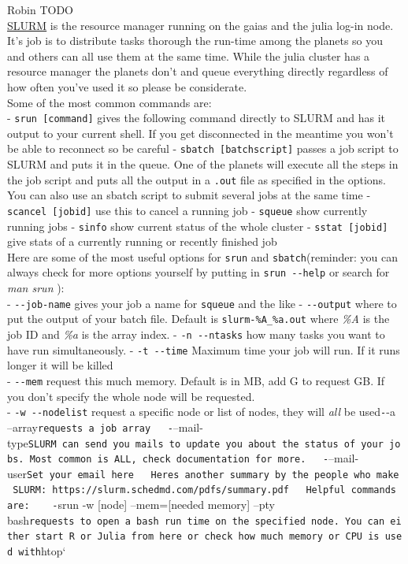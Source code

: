 \documentclass[
]{book}
\begin{document}
Robin TODO\\
\href{https://slurm.schedmd.com/overview.html}{SLURM} is the resource manager
running on the gaias and the julia log-in node. It's job is to
distribute tasks thorough the run-time among the planets so you and
others can all use them at the same time. While the julia cluster has a
resource manager the planets don't and queue everything directly
regardless of how often you've used it so please be considerate.\\
Some of the most common commands are:\\
- \texttt{srun\ {[}command{]}} gives the following command directly to SLURM and has
it output to your current shell. If you get disconnected in the meantime
you won't be able to reconnect so be careful - \texttt{sbatch\ {[}batchscript{]}}
passes a job script to SLURM and puts it in the queue. One of the
planets will execute all the steps in the job script and puts all the
output in a \texttt{.out} file as specified in the options. You can also use an
sbatch script to submit several jobs at the same time -
\texttt{scancel\ {[}jobid{]}} use this to cancel a running job - \texttt{squeue} show
currently running jobs - \texttt{sinfo} show current status of the whole
cluster - \texttt{sstat\ {[}jobid{]}} give stats of a currently running or recently
finished job\\
Here are some of the most useful options for \texttt{srun} and
\texttt{sbatch}(reminder: you can always check for more options yourself by
putting in \texttt{srun\ -\/-help} or search for \emph{man srun} ):\\
- \texttt{-\/-job-name} gives your job a name for \texttt{squeue} and the like -
\texttt{-\/-output} where to put the output of your batch file. Default is
\texttt{slurm-\%A\_\%a.out} where \emph{\%A} is the job ID and \emph{\%a} is the array index.
- \texttt{-n\ -\/-ntasks} how many tasks you want to have run simultaneously. -
\texttt{-t\ -\/-time} Maximum time your job will run. If it runs longer it will be
killed\\
- \texttt{-\/-mem} request this much memory. Default is in MB, add G to request
GB. If you don't specify the whole node will be requested.\\
- \texttt{-w\ -\/-nodelist} request a specific node or list of nodes, they will
\emph{all} be used\texttt{-}-a
--array\texttt{requests\ a\ job\ array\ \ \ -}--mail-type\texttt{SLURM\ can\ send\ you\ mails\ to\ update\ you\ about\ the\ status\ of\ your\ jobs.\ Most\ common\ is\ ALL,\ check\ documentation\ for\ more.\ \ \ -}--mail-user\texttt{Set\ your\ email\ here\ \ \ Here\textquotesingle{}s\ another\ summary\ by\ the\ people\ who\ make\ SLURM:\ https://slurm.schedmd.com/pdfs/summary.pdf\ \ \ Helpful\ commands\ are:\ \ \ \ -}srun
-w {[}node{]} --mem={[}needed memory{]} --pty
bash\texttt{requests\ to\ open\ a\ bash\ run\ time\ on\ the\ specified\ node.\ You\ can\ either\ start\ R\ or\ Julia\ from\ here\ or\ check\ how\ much\ memory\ or\ CPU\ is\ used\ with}htop`
\end{document}
